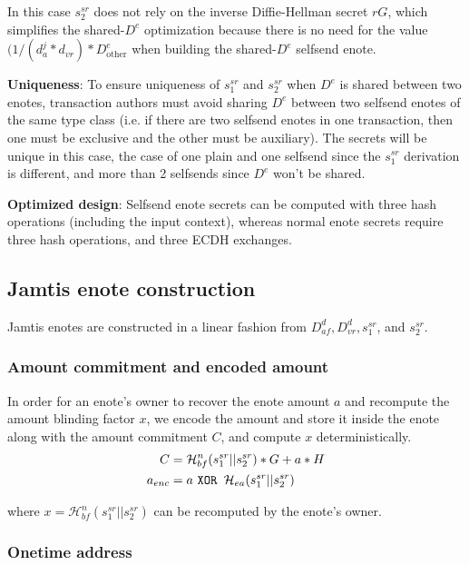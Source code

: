 In this case $s^{sr}_2$ does not rely on the inverse Diffie-Hellman secret $r G$, which simplifies the shared-$D^e$ optimization because there is no need for the value $(1/(d^j_a * d_{vr}) * D^e_{\textrm{other}}$ when building the shared-$D^e$ selfsend enote.

\textbf{Uniqueness}: To ensure uniqueness of $s^{sr}_1$ and $s^{sr}_2$ when $D^e$ is shared between two enotes, transaction authors must avoid sharing $D^e$ between two selfsend enotes of the same type class (i.e. if there are two selfsend enotes in one transaction, then one must be exclusive and the other must be auxiliary). The secrets will be unique in this case, the case of one plain and one selfsend since the $s^{sr}_1$ derivation is different, and more than 2 selfsends since $D^e$ won't be shared.

\textbf{Optimized design}: Selfsend enote secrets can be computed with three hash operations (including the input context), whereas normal enote secrets require three hash operations, and three ECDH exchanges.


\subsection{Jamtis enote construction}
\label{subsec:jamtis-enote-construction}

Jamtis enotes are constructed in a linear fashion from $D^d_{af}, D^d_{vr}, s^{sr}_1$, and $s^{sr}_2$.

\subsubsection{Amount commitment and encoded amount}
\label{subsubsec:jamtis-enote-construction-amount}

In order for an enote's owner to recover the enote amount $a$ and recompute the amount blinding factor $x$, we encode the amount and store it inside the enote along with the amount commitment $C$, and compute $x$ deterministically.\vspace{.115cm}
\begin{align*}
    C       &= \mathcal{H}^n_{bf}(s^{sr}_1 || s^{sr}_2)*G + a*H \\
    a_{enc} &= a \textrm{ \tt  XOR } \mathcal{H}_{ea}(s^{sr}_1 || s^{sr}_2)
\end{align*}

where $x = \mathcal{H}^n_{bf}(s^{sr}_1 || s^{sr}_2)$ can be recomputed by the enote's owner.

\subsubsection{Onetime address}
\label{subsubsec:jamtis-enote-construction-onetime-address}


